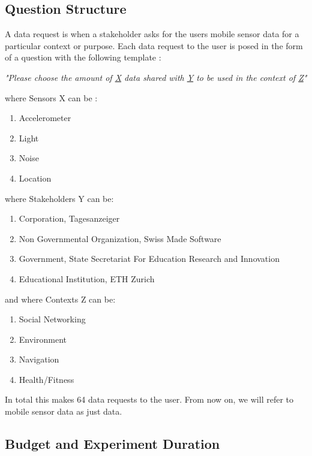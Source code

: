 \subsection{Question Structure} \label{struct}

A data request is when a stakeholder asks for the users mobile sensor data for a particular context or purpose. Each data request to the user is posed in the form of a question with the following template :

\textit{"Please choose the amount of \underline{X} data shared with \underline{Y} to be used in the context of \underline{Z}"}

where Sensors X can be :
\begin{enumerate}
    \item Accelerometer
    \item Light
    \item Noise
    \item Location
\end{enumerate}
where Stakeholders Y can be:
\begin{enumerate}
    \item Corporation, Tagesanzeiger 
    \item Non Governmental Organization, Swiss Made Software
    \item Government, State Secretariat For Education Research and Innovation
    \item Educational Institution, ETH Zurich
\end{enumerate}
and where Contexts Z can be:
\begin{enumerate}
	\item Social Networking
    \item Environment
    \item Navigation
    \item Health/Fitness  
\end{enumerate}

In total this makes 64 data requests to the user. From now on, we will refer to mobile sensor data as just data.

\subsection{Budget and Experiment Duration}

